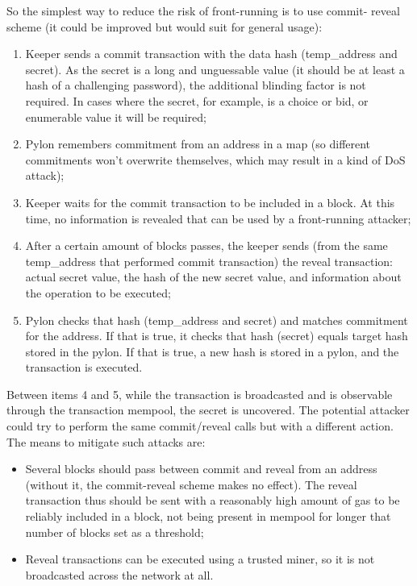 \documentclass[12pt]{article}
\begin{document}
\smallskip
So the simplest way to reduce the risk of front-running is to use commit- reveal scheme (it could be improved but would suit for general usage):
\begin{enumerate}
\item{Keeper sends a commit transaction with the data hash (temp\_address and secret). As the secret is a long and unguessable value (it should be at least a hash of a challenging password), the additional blinding factor is not required. In cases where the secret, for example, is a choice or bid, or enumerable value it will be required;}
\item{Pylon remembers commitment from an address in a map (so different commitments won’t overwrite themselves, which may result in a kind of DoS attack);}
\item{Keeper waits for the commit transaction to be included in a block. At this time, no information is revealed that can be used by a front-running attacker;}
\item{After a certain amount of blocks passes, the keeper sends (from the same temp\_address that performed commit transaction) the reveal transaction: actual secret value, the hash of the new secret value, and information about the operation to be executed;}
\item{Pylon checks that hash (temp\_address and secret) and matches commitment for the address. If that is true, it checks that hash (secret) equals target hash stored in the pylon. If that is true, a new hash is stored in a pylon, and the transaction is executed.}
\end{enumerate}

Between items 4 and 5, while the transaction is broadcasted and is observable through the transaction mempool, the secret is uncovered. The potential attacker could try to perform the same commit/reveal calls but with a different action. The means to mitigate such attacks are:
\begin{itemize}
\item{Several blocks should pass between commit and reveal from an address (without it, the commit-reveal scheme makes no effect). The reveal transaction thus should be sent with a reasonably high amount of gas to be reliably included in a block, not being present in mempool for longer that number of blocks set as a threshold;}
\item{Reveal transactions can be executed using a trusted miner, so it is not broadcasted across the network at all.}
\end{itemize}
\end{document}
